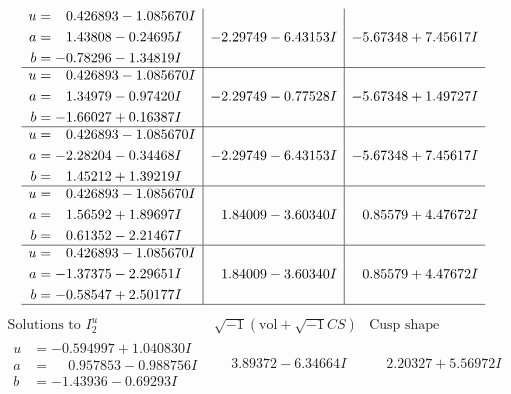 \documentclass[1p]{elsarticle_modified}
\theoremstyle{definition}
\newcommand{\I}{\sqrt{-1}}
\begin{document}
$$\begin{array}{c|c|c}
\begin{aligned}
u &= \phantom{-}0.426893 - 1.085670 I \\
a &= \phantom{-}1.43808 - 0.24695 I \\
b &= -0.78296 - 1.34819 I\end{aligned}
 & -2.29749 - 6.43153 I & -5.67348 + 7.45617 I \\ \hline\begin{aligned}
u &= \phantom{-}0.426893 - 1.085670 I \\
a &= \phantom{-}1.34979 - 0.97420 I \\
b &= -1.66027 + 0.16387 I\end{aligned}
 & -2.29749 - 0.77528 I & -5.67348 + 1.49727 I \\ \hline\begin{aligned}
u &= \phantom{-}0.426893 - 1.085670 I \\
a &= -2.28204 - 0.34468 I \\
b &= \phantom{-}1.45212 + 1.39219 I\end{aligned}
 & -2.29749 - 6.43153 I & -5.67348 + 7.45617 I \\ \hline\begin{aligned}
u &= \phantom{-}0.426893 - 1.085670 I \\
a &= \phantom{-}1.56592 + 1.89697 I \\
b &= \phantom{-}0.61352 - 2.21467 I\end{aligned}
 & \phantom{-}1.84009 - 3.60340 I & \phantom{-}0.85579 + 4.47672 I \\ \hline\begin{aligned}
u &= \phantom{-}0.426893 - 1.085670 I \\
a &= -1.37375 - 2.29651 I \\
b &= -0.58547 + 2.50177 I\end{aligned}
 & \phantom{-}1.84009 - 3.60340 I & \phantom{-}0.85579 + 4.47672 I\\
 \hline 
 \end{array}$$\newpage$$\begin{array}{c|c|c}  
\text{Solutions to }I^u_{2}& \I (\text{vol} + \sqrt{-1}CS) & \text{Cusp shape}\\
 \hline 
\begin{aligned}
u &= -0.594997 + 1.040830 I \\
a &= \phantom{-}0.957853 - 0.988756 I \\
b &= -1.43936 - 0.69293 I\end{aligned}
 & \phantom{-}3.89372 - 6.34664 I & \phantom{-}2.20327 + 5.56972 I \\ \hline\begin{aligned}

\end{aligned}
\end{array}$$
\end{document}
